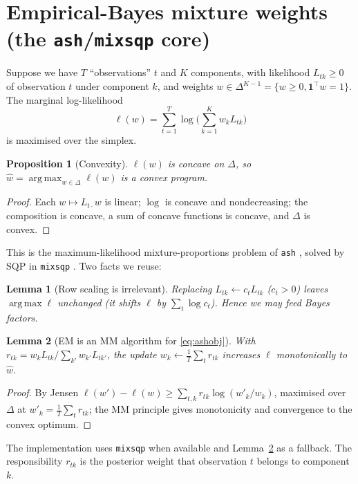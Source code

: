 \documentclass[11pt]{article}
\newcommand{\simplex}{\Delta}
\DeclareMathOperator*{\argmax}{arg\,max}
\newtheorem{proposition}{Proposition}
\newtheorem{lemma}{Lemma}
\begin{document}
\section{Empirical-Bayes mixture weights (the \texttt{ash}/\texttt{mixsqp} core)}
\label{sec:eb}
Suppose we have $T$ ``observations'' $t$ and $K$ components, with likelihood
$L_{tk}\ge0$ of observation $t$ under component $k$, and weights
$w\in\simplex^{K-1}=\{w\ge0,\mathbf 1^\top w=1\}$. The marginal log-likelihood
\begin{equation}
\ell(w)=\sum_{t=1}^T \log\Big(\sum_{k=1}^K w_k L_{tk}\Big)
\label{eq:ashobj}
\end{equation}
is maximised over the simplex.

\begin{proposition}[Convexity]
\label{prop:convex}
$\ell(w)$ is concave on $\simplex$, so $\hat w=\argmax_{w\in\simplex}\ell(w)$ is a
convex program.
\end{proposition}
\begin{proof}
Each $w\mapsto L_{t\cdot}w$ is linear; $\log$ is concave and nondecreasing; the
composition is concave, a sum of concave functions is concave, and $\simplex$ is
convex.
\end{proof}

\noindent This is the maximum-likelihood mixture-proportions problem of
\texttt{ash} \citep{stephens2017}, solved by SQP in \texttt{mixsqp}
\citep{kim2020}. Two facts we reuse:

\begin{lemma}[Row scaling is irrelevant]
\label{lem:scale}
Replacing $L_{tk}\leftarrow c_t L_{tk}$ ($c_t>0$) leaves $\argmax\ell$ unchanged
(it shifts $\ell$ by $\sum_t\log c_t$). Hence we may feed \emph{Bayes factors}.
\end{lemma}

\begin{lemma}[EM is an MM algorithm for \eqref{eq:ashobj}]
\label{lem:em}
With $r_{tk}= w_k L_{tk}/\sum_{k'}w_{k'}L_{tk'}$, the update
$w_k \leftarrow \tfrac1T\sum_t r_{tk}$ increases $\ell$ monotonically to $\hat w$.
\end{lemma}
\begin{proof}
By Jensen $\ell(w')-\ell(w)\ge\sum_{t,k}r_{tk}\log(w'_k/w_k)$, maximised over
$\simplex$ at $w'_k=\tfrac1T\sum_t r_{tk}$; the MM principle gives monotonicity
and convergence to the convex optimum.
\end{proof}

\noindent The implementation uses \texttt{mixsqp} when available and
Lemma~\ref{lem:em} as a fallback. The responsibility $r_{tk}$ is the posterior
weight that observation $t$ belongs to component $k$.
\end{document}

